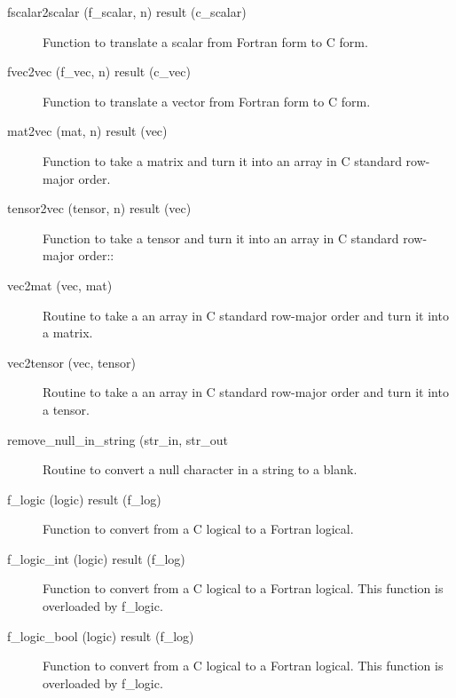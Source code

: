 \begin{description}

\label{r:fscalar2scalar}
\item[fscalar2scalar (f_scalar, n) result (c_scalar)] \Newline 
Function to translate a scalar from Fortran form to C form.

\label{r:fvec2vec}
\item[fvec2vec (f_vec, n) result (c_vec)] \Newline 
Function to translate a vector from Fortran form to C form.

\label{r:mat2vec}
\item[mat2vec (mat, n) result (vec)] \Newline 
Function to take a matrix and turn it into an array in C standard row-major order.

\label{r:tensor2vec}
\item[tensor2vec (tensor, n) result (vec)] \Newline 
Function to take a tensor and turn it into an array in 
C standard row-major order::

\label{r:vec2mat}
\item[vec2mat (vec, mat)] \Newline 
Routine to take a an array in C standard row-major 
order and turn it into a matrix.

\label{r:vec2tensor}
\item[vec2tensor (vec, tensor)] \Newline 
Routine to take a an array in C standard row-major 
order and turn it into a tensor.

\label{r:remove.null.in.string}
\item[remove_null_in_string (str_in, str_out] \Newline 
Routine to convert a null character in a string to a blank.

\label{r:f.logic}
\item[f_logic (logic) result (f_log)] \Newline 
Function to convert from a C logical to a Fortran logical.

\label{r:f.logic.int}
\item[f_logic_int (logic) result (f_log)] \Newline 
Function to convert from a C logical to a Fortran logical.
This function is overloaded by f_logic.

\label{r:f.logic.bool}
\item[f_logic_bool (logic) result (f_log)] \Newline 
Function to convert from a C logical to a Fortran logical.
This function is overloaded by f_logic.


\end{description}
